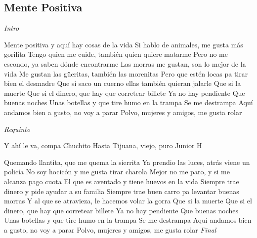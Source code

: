 \subsection{Mente Positiva}
\noindent

\vspace{1cm}

\begin{guitar}
	\begin{multicols}{2}
		\textit{Intro}
	
	Mente positiva y aquí hay cosas de la vida
	Si hablo de animales, me gusta más gorilita
	Tengo quien me cuide, también quien quiere matarme
	Pero no me escondo, ya saben dónde encontrarme
	Las morras me gustan, son lo mejor de la vida
	Me gustan las güeritas, también las morenitas
	Pero que estén locas pa tirar bien el desmadre
	Que si saco un cuerno ellas también quieran jalarle
	Que si la muerte
	Que si el dinero, que hay que corretear billete
	Ya no hay pendiente
	Que buenas noches
	Unas botellas y que tire humo en la trampa
	Se me destrampa
	Aquí andamos bien a gusto, no voy a parar
	Polvo, mujeres y amigos, me gusta rolar
	\par
	\textit{Requinto}

	Y ahí le va, compa Chuchito
	Hasta Tijuana, viejo, puro Junior H
	\par
	Quemando llantita, que me quema la sierrita
	Ya prendio las luces, atrás viene un policía
	No soy hocicón y me gusta tirar charola
	Mejor no me paro, y si me alcanza pago cuota
	El que es aventado y tiene huevos en la vida
	Siempre trae dinero y pide ayudar a su familia
	Siempre trae buen carro pa levantar buenas morras
	Y al que se atravieza, le hacemos volar la gorra
	Que si la muerte
	Que si el dinero, que hay que corretear billete
	Ya no hay pendiente
	Que buenas noches
	Unas botellas y que tire humo en la trampa
	Se me destrampa
	Aquí andamos bien a gusto, no voy a parar
	Polvo, mujeres y amigos, me gusta rolar
		\textit{Final}
	\end{multicols}
\end{guitar}
